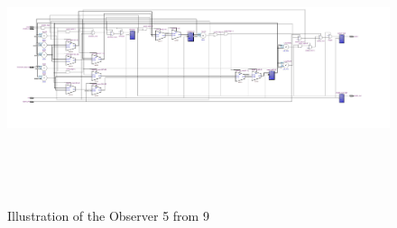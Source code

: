 \begin{figure}[]
\centering
\includegraphics[width=650px,height=300px,angle=-90]{../../pictures/13.06.2014/plain_generator/200Mhz/10OBS/observer_OBS_9.jpg}
\caption[Observer 9  of the Final Version]{Illustration of the Observer 5 from 9 }
\label{fig:version:final:obs:9}
\end{figure}

